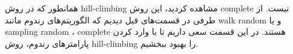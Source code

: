همانطور که در روش hill-climbing مشاهده کردید، این روش complete نیست.
از طرفی در قسمت‌های قبل دیدیم که الگوریتم‌های رندوم مانند walk random و یا sampling random ، complete هستند.
در این قسمت سعی داریم تا با وارد کردن پارامتر‌های رندوم، روش hill-climbing را بهبود ببخشیم.

